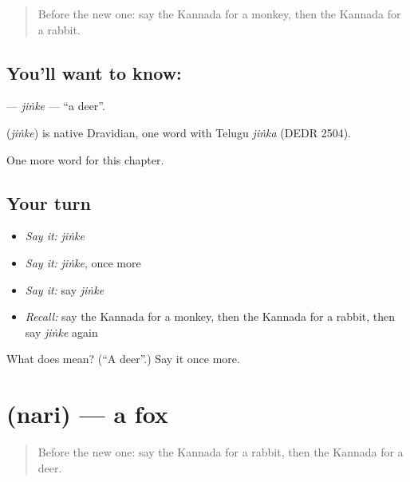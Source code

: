 \label{lesson:KA-C130-jinke}



\begin{quote}
Before the new one: say the Kannada for a monkey, then the Kannada for a rabbit.
\end{quote}

\subsection*{You'll want to know: }
\textbf{} — \emph{jiṅke} — \textquotedblleft{}a deer\textquotedblright{}.

\begin{cousinweb}
\textbf{} (\emph{jiṅke}) is native Dravidian, one word with Telugu \emph{jiṅka} (DEDR 2504).
\end{cousinweb}

\begin{grammarlens}[title={What you've built}]
One more word for this chapter.
\end{grammarlens}

\subsection*{Your turn}
\begin{itemize}
\raggedright
  \item \emph{Say it:} \emph{jiṅke}
  \item \emph{Say it:} \emph{jiṅke}, once more
  \item \emph{Say it:} say \emph{jiṅke}
  \item \emph{Recall:} say the Kannada for a monkey, then the Kannada for a rabbit, then say \emph{jiṅke} again
\end{itemize}

\begin{tcolorbox}[breakable,colback=teal!4,colframe=teal!35!black,title={Before you move on}]
What does  mean? (\textquotedblleft{}A deer\textquotedblright{}.) Say it once more.
\end{tcolorbox}
\section[\texorpdfstring{\kn{ನರಿ} (nari)}{ನರಿ (nari)}]{ (nari) — a fox}

\label{lesson:KA-C130-nari}



\begin{quote}
Before the new one: say the Kannada for a rabbit, then the Kannada for a deer.
\end{quote}

